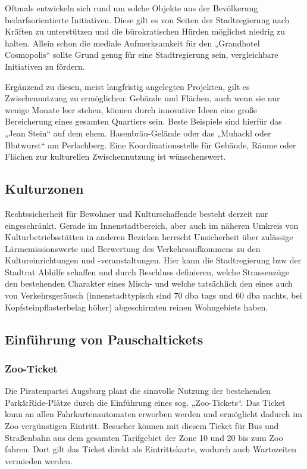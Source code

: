 \documentclass[a5paper, twoside, ngerman, 10pt]{scrbook}
\begin{document}
   Oftmals entwickeln sich rund um solche Objekte aus der Bevölkerung 
   bedarfsorientierte Initiativen. Diese gilt es von Seiten der Stadtregierung 
   nach Kräften zu unterstützen und die bürokratischen Hürden möglichst 
   niedrig zu halten. Allein schon die mediale Aufmerksamkeit für den 
   „Grandhotel Cosmopolis“ sollte Grund genug für eine Stadtregierung sein, 
   vergleichbare Initiativen zu fördern.
   
   Ergänzend zu diesen, meist langfristig angelegten Projekten, gilt es 
   Zwischennutzung zu ermöglichen: Gebäude und Flächen, auch wenn sie nur 
   wenige Monate leer stehen, können durch innovative Ideen eine große 
   Bereicherung eines gesamten Quartiers sein. Beste Beispiele sind hierfür 
   das „Jean Stein“ auf dem ehem. Hasenbräu-Gelände oder das „Muhackl oder 
   Blutwurst“ am Perlachberg. Eine Koordinationsstelle für Gebäude, Räume oder 
   Flächen zur kulturellen Zwischennutzung ist wünschenswert.
   
   \subsection{Kulturzonen}
   
   Rechtssicherheit für Bewohner und Kulturschaffende besteht derzeit nur 
   eingeschränkt. Gerade im Innenstadtbereich, aber auch im näheren Umkreis 
   von Kulturbetriebsstätten in anderen Bezirken herrscht Unsicherheit über 
   zulässige Lärmemissionswerte und Berwertung des Verkehrsaufkommens zu den 
   Kultureinrichtungen und -veranstaltungen. Hier kann die Stadtregierung bzw 
   der Stadtrat Abhilfe schaffen und durch Beschluss definieren, welche 
   Strassenzüge den bestehenden Charakter eines Misch- und welche tatsächlich 
   den eines auch von Verkehrsgeräusch (innenstadttypisch sind 70 dba tags und 
   60 dba nachts, bei Kopfsteinpflasterbelag höher) abgeschirmten reinen 
   Wohngebiets haben.
   
   \subsection{Einführung von Pauschaltickets}
   
   \subsubsection{Zoo-Ticket}
   
   Die Piratenpartei Augsburg plant die sinnvolle Nutzung der bestehenden 
   Park\&Ride-Plätze durch die Einführung eines sog. „Zoo-Tickets“. Das Ticket 
   kann an allen Fahrkartenautomaten erworben werden und ermöglicht dadurch im 
   Zoo vergünstigen Eintritt. Besucher können mit diesem Ticket für Bus und 
   Straßenbahn aus dem gesamten Tarifgebiet der Zone 10 und 20 bis zum Zoo 
   fahren. Dort gilt das Ticket direkt als Eintrittskarte, wodurch auch 
   Wartezeiten vermieden werden.
   
\end{document}
